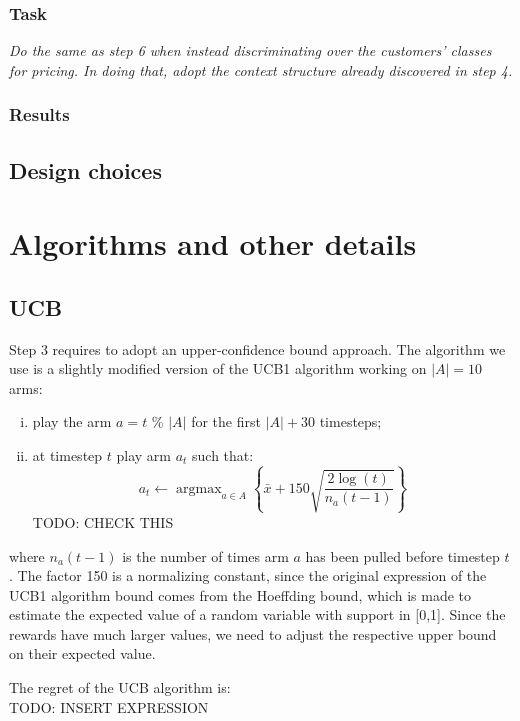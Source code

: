 \documentclass[12pt,a4paper]{report}
\DeclareMathOperator*{\argmax}{argmax}
\begin{document}
			\subsection{Task}
\textit{Do the same as step 6 when instead discriminating over the customers’ classes for pricing. In doing that, adopt the context structure already discovered in step 4.}
			\subsection{Results}
		\section{Design choices}

	\chapter{Algorithms and other details}
		\section{UCB}
Step 3 requires to adopt an upper-confidence bound approach. The algorithm we use is a slightly modified version of the UCB1 algorithm working on $|A|=10$ arms:
\begin{enumerate}[i)]
	\item play the arm $a=t$  $\%$  $|A|$ for the first $|A|+30$ timesteps;
	\item at timestep $t$ play arm $a_t$ such that:
		$$a_t \leftarrow \argmax_{a \in A} \left\{\bar x + 150 \sqrt{\frac{2 \log(t)}{n_a(t-1)}}\right\} $$
TODO: CHECK THIS
\end{enumerate}
where $n_a(t-1)$ is the number of times arm $a$ has been pulled before timestep $t$. The factor 150 is a normalizing constant, since the original expression of the UCB1 algorithm bound comes from the Hoeffding bound, which is made to estimate the expected value of a random variable with support in [0,1]. Since the rewards have much larger values, we need to adjust the respective upper bound on their expected value.

The regret of the UCB algorithm is: \\TODO: INSERT EXPRESSION
\end{document}
